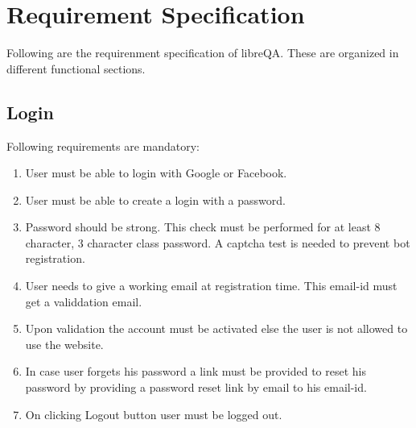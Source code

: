 \documentclass[letterpaper,10pt,english]{sphinxmanual}
\begin{document}
\chapter{Requirement Specification}
\label{req:requirement-specification}\label{req::doc}
Following are the requirenment specification of libreQA. These are organized in
different functional sections.


\section{Login}
\label{req:login}
Following requirements are mandatory:
\begin{enumerate}
\item {} 
User must be able to login with Google or Facebook.

\item {} 
User must be able to create a login with a password.

\item {} 
Password should be strong. This check must be performed for at least 8
character, 3 character class password. A captcha test is needed to prevent
bot registration.

\item {} 
User needs to give a working email at registration time. This email-id must
get a validdation email.

\item {} 
Upon validation the account must be activated else the user is not allowed
to use the website.

\item {} 
In case user forgets his password a link must be provided to reset his password
by providing a password reset link by email to his email-id.

\item {} 
On clicking Logout button user must be logged out.

\end{enumerate}
\end{document}
